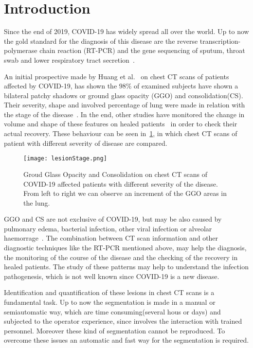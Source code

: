 \documentclass{standalone}
\begin{document}
\chapter*{Introduction}


Since the end of 2019, COVID-19 has widely spread all over the world. Up to now the gold standard for the diagnosis of this disease are the reverse transcription-polymerase chain reaction (RT-PCR) and the gene sequencing of sputum, throat swab and lower respiratory tract secretion~\cite{ART:Zhao}.

An initial prospective made by Huang et al. ~\cite{ART:Huang}on chest CT scans of patients affected by COVID-19, has shown the $98\%$ of examined subjects have shown a bilateral patchy shadows or ground glass opacity (GGO) and consolidation(CS). Their severity, shape and involved percentage of lung were made in relation with the stage of the disease~\cite{ART:Bernheim}. In the end, other studies have monitored the change in volume and shape of these features on healed patients~\cite{ART:Ai} in order to check their actual recovery. These behaviour can be seen in \figurename\,\ref{fig:HealthVSCovid}, in which chest CT scans of patient with different severity of disease are compared.

\begin{figure}[h!]
	\centering
	\texttt{[image: lesionStage.png]}
	\caption{Groud Glass Opacity and Consolidation on chest CT scans of COVID-19 affected patients with different severity of the disease. From left to right we can observe an increment of the GGO areas in the lung.}\label{fig:HealthVSCovid}
\end{figure} 

GGO and CS are not exclusive of COVID-19, but may be also caused by pulmonary edema, bacterial infection, other viral infection or alveolar haemorrage~\cite{ART:Collins}. The combination between CT scan information and other diagnostic techniques like the RT-PCR mentioned above, may help the diagnosis, the monitoring of the course of the disease and the checking of the recovery in healed patients. The study of these patterns may help to understand the infection pathogenesis, which is not well known since COVID-19 is a new disease.

Identification and quantification of these lesions in chest CT scans is a fundamental task. Up to now the segmentation is made in a manual or semiautomatic way, which are time consuming(several hous or days) and subjected to the operator experience, since involves the interaction with trained personnel. Moreover these kind of segmentation cannot be reproduced. To overcome these issues an automatic and fast way for the segmentation is required.
\end{document}
